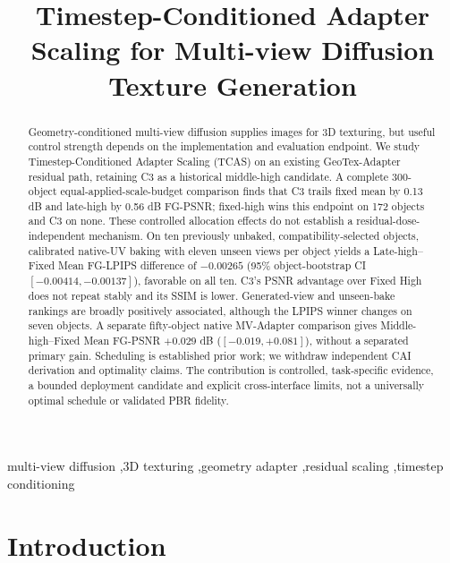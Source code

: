 \documentclass[times,twocolumn,final]{elsarticle}
\begin{document}
\begin{frontmatter}

\title{Timestep-Conditioned Adapter Scaling for Multi-view Diffusion Texture Generation}


\begin{abstract}
Geometry-conditioned multi-view diffusion supplies images for 3D texturing, but useful control strength depends on the implementation and evaluation endpoint. We study Timestep-Conditioned Adapter Scaling (TCAS) on an existing GeoTex-Adapter residual path, retaining C3 as a historical middle-high candidate. A complete 300-object equal-applied-scale-budget comparison finds that C3 trails fixed mean by 0.13 dB and late-high by 0.56 dB FG-PSNR; fixed-high wins this endpoint on 172 objects and C3 on none. These controlled allocation effects do not establish a residual-dose-independent mechanism. On ten previously unbaked, compatibility-selected objects, calibrated native-UV baking with eleven unseen views per object yields a Late-high--Fixed Mean FG-LPIPS difference of $-0.00265$ (95\% object-bootstrap CI $[-0.00414,-0.00137]$), favorable on all ten. C3's PSNR advantage over Fixed High does not repeat stably and its SSIM is lower. Generated-view and unseen-bake rankings are broadly positively associated, although the LPIPS winner changes on seven objects. A separate fifty-object native MV-Adapter comparison gives Middle-high--Fixed Mean FG-PSNR $+0.029$ dB ($[-0.019,+0.081]$), without a separated primary gain. Scheduling is established prior work; we withdraw independent CAI derivation and optimality claims. The contribution is controlled, task-specific evidence, a bounded deployment candidate and explicit cross-interface limits, not a universally optimal schedule or validated PBR fidelity.
\end{abstract}

\begin{keyword}
\KWD
multi-view diffusion \sep 3D texturing \sep geometry adapter \sep residual scaling \sep timestep conditioning
\end{keyword}

\end{frontmatter}

\linenumbers

\section{Introduction}
\label{sec:intro}
\end{document}
